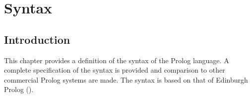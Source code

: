 %
%
%
%
%
%
%

\chapter{Syntax}
\label{chapsyntax}

\section{Introduction}

This chapter provides a definition of the syntax of the {\eclipse} Prolog
language.
A complete specification of the syntax is provided and comparison  to
other commercial Prolog systems are made. The {\eclipse} syntax is based on that
of Edinburgh Prolog (\cite{bowen81}).


